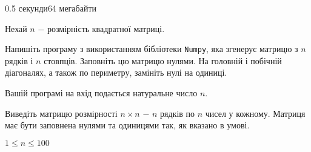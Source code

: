 \begin{problem}{}{}{}{0.5 секунди}{64 мегабайти}

Нехай $n$ $-$ розмірність квадратної матриці.

Напишіть програму з використанням бібліотеки \texttt{Numpy}, яка згенерує матрицю з $n$ рядків і $n$ стовпців.
Заповніть цю матрицю нулями. На головній і побічній діагоналях, а також по периметру, замініть нулі на одиниці.

\InputFile
Вашій програмі на вхід подається натуральне число $n$.

\OutputFile
Виведіть матрицю розмірності $n \times n$ $-$ $n$ рядків по $n$ чисел у кожному. 
Матриця має бути заповнена нулями та одиницями так, як вказано в умові.

\Constraints
$1 \le n \le 100$

\Examples
\begin{example}
%
%
\end{example}

\end{problem}

